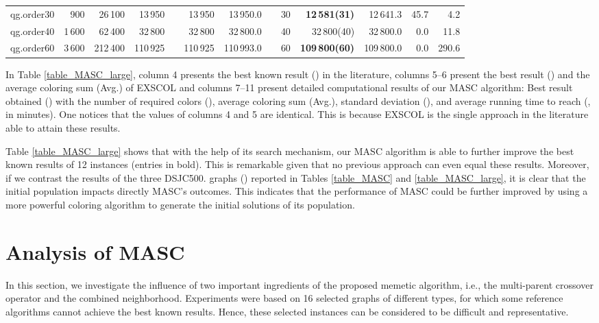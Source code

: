 \documentclass{elsart}
\begin{document}
\begin{table}
\begin{scriptsize}
\begin{tabular}{lrrrcrrcrrrrr}
qg.order30    & 900 & 26\,100 &13\,950 &&13\,950 &13\,950.0 &&30&  \textbf{12\,581(31)} & 12\,641.3&45.7 & 4.2\\
qg.order40    &1\,600 &62\,400 &32\,800 &&32\,800 &32\,800.0 &&40&  32\,800(40)& 32\,800.0&0.0 & 11.8 \\
qg.order60    & 3\,600 & 212\,400 &110\,925 &&110\,925 &110\,993.0 &&60&  \textbf{109\,800(60)} &109\,800.0 &0.0 &290.6  \\

\hline
\end{tabular}
\end{scriptsize}
\end{table}

In Table \ref{table_MASC_large}, column 4 presents the best known result () in the literature, columns 5--6 present the best result () and the average coloring sum (Avg.) of EXSCOL and columns 7--11 present detailed computational results of our MASC algorithm: Best result obtained () with the number of required colors (), average coloring sum (Avg.), standard deviation (), and average running time to reach  (, in minutes). One notices that the values of columns 4 and 5 are identical. This is because EXSCOL is the single approach in the literature able to attain these results. 


Table \ref{table_MASC_large} shows that with the help of its search mechanism, our MASC algorithm is able to further improve the best known results of 12 instances (entries in bold). This is remarkable given that no previous approach can even equal these results. Moreover, if we contrast the results of the three DSJC500. graphs ()  reported in Tables \ref{table_MASC} and \ref{table_MASC_large}, it is clear that the initial population impacts directly MASC's outcomes. This indicates that the performance of MASC could be further improved by using a more powerful coloring algorithm to generate the initial solutions of its population.

\section{Analysis of MASC}
\label{Sec_analysis_MASC}

In this section, we investigate the influence of two important ingredients of the proposed memetic algorithm, i.e., the multi-parent crossover operator and the combined neighborhood. Experiments were based on 16 selected graphs of different types, for which some reference algorithms cannot achieve the best known results. Hence, these selected instances can be considered to be difficult and representative.
\end{document}
